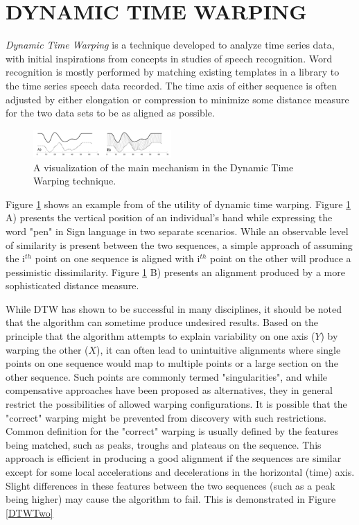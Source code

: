\documentclass[letterpaper, 10 pt, conference]{ieeeconf}  %
\begin{document}

\section{DYNAMIC TIME WARPING}

\textit{Dynamic Time Warping} \cite{berndt1994using} is a technique developed to analyze time series data, with initial inspirations from concepts in studies of speech recognition. Word recognition is mostly performed by matching existing templates in a library to the time series speech data recorded. The time axis of either sequence is often adjusted by either elongation or compression to minimize some distance measure for the two data sets to be as aligned as possible.

\begin{figure}[thpb]
  \centering
  \includegraphics[width=0.47\textwidth]{DTWOne.png}
  \caption{A visualization of the main mechanism in the Dynamic Time Warping technique. \cite{doi:10.1137/1.9781611972719.1}}
  \label{DTWOne}
\end{figure}

Figure \ref{DTWOne} shows an example from \cite{doi:10.1137/1.9781611972719.1} of the utility of dynamic time warping. Figure \ref{DTWOne} A) presents the vertical position of an individual's hand while expressing the word "pen" in Sign language in two separate scenarios. While an observable level of similarity is present between the two sequences, a simple approach of assuming the i$^{th}$ point on one sequence is aligned with i$^{th}$ point on the other will produce a pessimistic dissimilarity. Figure \ref{DTWOne} B) presents an alignment produced by a more sophisticated distance measure.

While DTW has shown to be successful in many disciplines, it should be noted that the algorithm can sometime produce undesired results. Based on the principle that the algorithm attempts to explain variability on one axis ($Y$) by warping the other ($X$), it can often lead to unintuitive alignments where single points on one sequence would map to multiple points or a large section on the other sequence. Such points are commonly termed "singularities", and while compensative approaches have been proposed as alternatives, they in general restrict the possibilities of allowed warping configurations. It is possible that the "correct" warping might be prevented from discovery with such restrictions. Common definition for the "correct" warping is usually defined by the features being matched, such as peaks, troughs and plateaus on the sequence. This approach is efficient in producing a good alignment if the sequences are similar except for some local accelerations and decelerations in the horizontal (time) axis. Slight differences in these features between the two sequences (such as a peak being higher) may cause the algorithm to fail. This is demonstrated in Figure \ref{DTWTwo}
\end{document}
